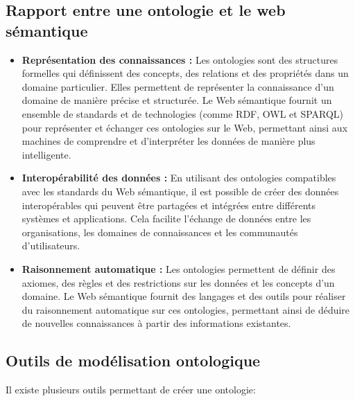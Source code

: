 \subsection{Rapport entre une ontologie et le web sémantique}
\begin{itemize}
	\item \textbf{Représentation des connaissances :} Les ontologies sont des structures formelles qui définissent des concepts, des relations et des propriétés dans un domaine particulier. Elles permettent de représenter la connaissance d'un domaine de manière précise et structurée. Le Web sémantique fournit un ensemble de standards et de technologies (comme RDF, OWL et SPARQL) pour représenter et échanger ces ontologies sur le Web, permettant ainsi aux machines de comprendre et d'interpréter les données de manière plus intelligente.
	
	\item \textbf{Interopérabilité des données :} En utilisant des ontologies compatibles avec les standards du Web sémantique, il est possible de créer des données interopérables qui peuvent être partagées et intégrées entre différents systèmes et applications. Cela facilite l'échange de données entre les organisations, les domaines de connaissances et les communautés d'utilisateurs.
	
	\item \textbf{Raisonnement automatique :} Les ontologies permettent de définir des axiomes, des règles et des restrictions sur les données et les concepts d'un domaine. Le Web sémantique fournit des langages et des outils pour réaliser du raisonnement automatique sur ces ontologies, permettant ainsi de déduire de nouvelles connaissances à partir des informations existantes.
	
\end{itemize}

\subsection{Outils de modélisation ontologique}
Il existe plusieurs outils permettant de créer une ontologie:

